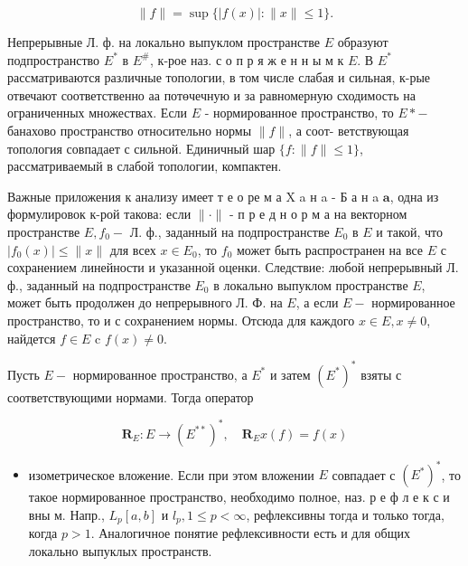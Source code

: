 \documentclass[10pt]{article}
\begin{document}
\[

\|f\|=\sup \{|f(x)|:\|x\| \leqslant 1\} .

\]



Непрерывные Л. ф. на локально выпуклом пространстве $E$ образуют подпространство $E^{*}$ в $E^{\#}$, к-рое наз. с о п р я ж е н н ы м к $E$. В $E^{*}$ рассматриваются различные топологии, в том числе слабая и сильная, к-рые отвечают соответственно аа потөчечную и за равномерную сходимость на ограниченных множествах. Если $E$ - нормированное пространство, то $E *-$ банахово пространство относительно нормы $\|f\|$, а соот- ветствующая топология совпадает с сильной. Единичный шар $\{f:\|f\| \leqslant 1\}$, рассматриваемый в слабой топологии, компактен.



Важные приложения к анализу имеет т е о ре м а X a н a - Б а н a $\mathbf{a}$, одна из формулировок к-рой такова: если $\|\cdot\|$ - п р е д н о р м а на векторном пространстве $E, f_{0}-$ Л. ф., заданный на подпространстве $E_{0}$ в $E$ и такой, что $\left|f_{0}(x)\right| \leqslant\|x\|$ для всех $x \in E_{0}$, то $f_{0}$ может быть распространен на все $E$ с сохранением линейности и указанной оценки. Следствие: любой непрерывный Л. ф., заданный на подпространстве $E_{0}$ в локально выпуклом пространстве $E$, может быть продолжен до непрерывного Л. Ф. на $E$, а если $E-$ нормированное пространство, то и с сохранением нормы. Отсюда для каждого $x \in E, x \neq 0$, найдется $f \in E$ c $f(x) \neq 0$.



Пусть $E-$ нормированное пространство, а $E^{*}$ и затем $\left(E^{*}\right)^{*}$ взяты с соответствующими нормами. Тогда оператор



\[

\boldsymbol{R}_{E}: E \longrightarrow\left(E^{* *}\right)^{*}, \quad \boldsymbol{R}_{E} x(f)=f(x)

\]



\begin{itemize}

  \item изометрическое вложение. Если при этом вложении $E$ совпадает с $\left(E^{*}\right)^{*}$, то такое нормированное пространство, необходимо полное, наз. р е ф л е к с и вны м. Напр., $L_{p}[a, b]$ и $l_{p}, 1 \leqslant p<\infty$, рефлексивны тогда и только тогда, когда $p>1$. Аналогичное понятие рефлексивности есть и для общих локально выпуклых пространств.

\end{itemize}
\end{document}
